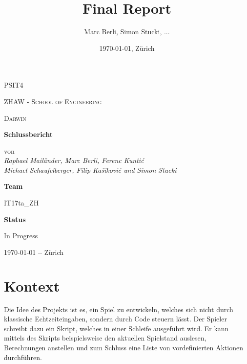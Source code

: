 \documentclass[a4paper, 11pt]{scrartcl}
\title{Final Report}
\author{Marc Berli, Simon Stucki, ...}
\date{\today{}, Zürich}
\let\oldsection\section
\renewcommand\section{\clearpage\oldsection}
\begin{document}
\begin{titlepage}
  \centering
  {\scshape\LARGE PSIT4 \par}
  \vspace{1cm}
  {\scshape ZHAW - School of Engineering\par}
  \vspace{1cm}
  {\scshape\Large Darwin\par}
  \vspace{1.5cm}
  {\huge\bfseries Schlussbericht\par}
  \vspace{2cm}
  von
  \vspace{1em}
  \Large\itshape \\ Raphael Mailänder, Marc Berli, Ferenc Kuntić \\ Michael Schaufelberger, Filip Kašiković und Simon Stucki\par
  \vfill
  \textbf{Team}\par
  IT17ta\_ZH\par
  \vspace{2em}
  \textbf{Status}\par
  In Progress

  \vfill

  {\large \today \textbf{ --} Zürich\par}
\end{titlepage}

\tableofcontents

\newpage

\section{Kontext}

Die Idee des Projekts ist es, ein Spiel zu entwickeln,
welches sich nicht durch klassische Echtzeiteingaben,
sondern durch Code steuern lässt.
Der Spieler schreibt dazu ein Skript,
welches in einer Schleife ausgeführt wird.
Er kann mittels des Skripts beispielsweise den aktuellen Spielstand auslesen,
Berechnungen anstellen und zum Schluss eine Liste von vordefinierten Aktionen durchführen.
\end{document}
